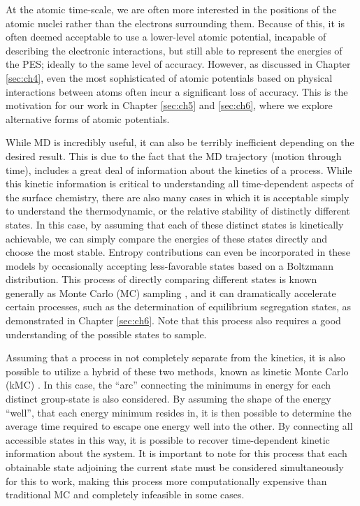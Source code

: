 \documentclass[12pt,oneside]{cmuthesis}
\begin{document}
At the atomic time-scale, we are often more interested in the positions of the atomic nuclei rather than the electrons surrounding them. Because of this, it is often deemed acceptable to use a lower-level atomic potential, incapable of describing the electronic interactions, but still able to represent the energies of the PES; ideally to the same level of accuracy. However, as discussed in Chapter \ref{sec:ch4}, even the most sophisticated of atomic potentials based on physical interactions between atoms often incur a significant loss of accuracy. This is the motivation for our work in Chapter \ref{sec:ch5} and \ref{sec:ch6}, where we explore alternative forms of atomic potentials.

While MD is incredibly useful, it can also be terribly inefficient depending on the desired result. This is due to the fact that the MD trajectory (motion through time), includes a great deal of information about the kinetics of a process. While this kinetic information is critical to understanding all time-dependent aspects of the surface chemistry, there are also many cases in which it is acceptable simply to understand the thermodynamic, or the relative stability of distinctly different states. In this case, by assuming that each of these distinct states is kinetically achievable, we can simply compare the energies of these states directly and choose the most stable. Entropy contributions can even be incorporated in these models by occasionally accepting less-favorable states based on a Boltzmann distribution. This process of directly comparing different states is known generally as Monte Carlo (MC) sampling \cite{mooney-1997-monte}, and it can dramatically accelerate certain processes, such as the determination of equilibrium segregation states, as demonstrated in Chapter \ref{sec:ch6}. Note that this process also requires a good understanding of the possible states to sample.

Assuming that a process in not completely separate from the kinetics, it is also possible to utilize a hybrid of these two methods, known as kinetic Monte Carlo (kMC) \cite{binder-1986-introd}. In this case, the ``arc'' connecting the minimums in energy for each distinct group-state is also considered. By assuming the shape of the energy ``well'', that each energy minimum resides in, it is then possible to determine the average time required to escape one energy well into the other. By connecting all accessible states in this way, it is possible to recover time-dependent kinetic information about the system. It is important to note for this process that each obtainable state adjoining the current state must be considered simultaneously for this to work, making this process more computationally expensive than traditional MC and completely infeasible in some cases.
\end{document}
